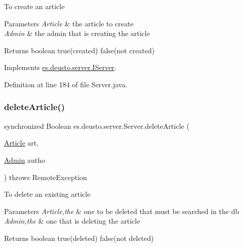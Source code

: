 To create an article


\begin{DoxyParams}{Parameters}
{\em Article} & the article to create \\
\hline
{\em Admin} & the admin that is creating the article \\
\hline
\end{DoxyParams}
\begin{DoxyReturn}{Returns}
boolean true(created) false(not created) 
\end{DoxyReturn}


Implements \hyperlink{interfacees_1_1deusto_1_1server_1_1_i_server_a74b3203c5a8d94e91004df0dc84ca386}{es.\+deusto.\+server.\+I\+Server}.



Definition at line 184 of file Server.\+java.

\mbox{\label{classes_1_1deusto_1_1server_1_1_server_ad9d8810833b631866924dc481801614a}} 
\subsubsection{\texorpdfstring{delete\+Article()}{deleteArticle()}}
{\footnotesize\ttfamily synchronized Boolean es.\+deusto.\+server.\+Server.\+delete\+Article (\begin{DoxyParamCaption}\item[{\hyperlink{classes_1_1deusto_1_1server_1_1jdo_1_1_article}{Article}}]{art,  }\item[{\hyperlink{classes_1_1deusto_1_1server_1_1jdo_1_1_admin}{Admin}}]{autho }\end{DoxyParamCaption}) throws Remote\+Exception}

To delete an existing article


\begin{DoxyParams}{Parameters}
{\em Article,the} & one to be deleted that must be searched in the db \\
\hline
{\em Admin,the} & one that is deleting the article \\
\hline
\end{DoxyParams}
\begin{DoxyReturn}{Returns}
boolean true(deleted) false(not deleted) 
\end{DoxyReturn}


